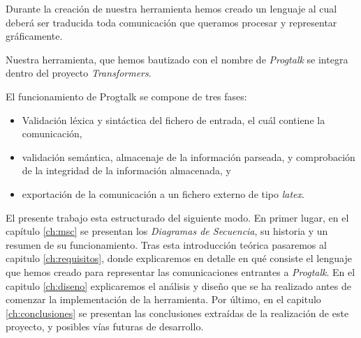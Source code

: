 Durante la creación de nuestra herramienta hemos creado un lenguaje 
al cual deberá ser traducida toda comunicación que queramos procesar y
representar gráficamente.

Nuestra herramienta, que hemos bautizado con el nombre de
\textit{Progtalk} se integra dentro del proyecto \textit{Transformers}. 

El funcionamiento de Progtalk se compone de tres fases:

\begin{itemize}
\item Validación léxica y sintáctica del fichero de entrada, el cuál
  contiene la comunicación,
\item validación semántica, almacenaje de la información parseada, y
  comprobación de la integridad de la información almacenada, y
\item exportación de la comunicación a un fichero externo de tipo
  \textit{latex}.
\end{itemize}

El presente trabajo esta estructurado del siguiente modo. En primer
lugar, en el capítulo \ref{ch:msc} se presentan los \textit{Diagramas
  de Secuencia}, su historia y un resumen de su funcionamiento. Tras
esta introducción teórica pasaremos al capitulo \ref{ch:requisitos},
donde explicaremos en detalle en qué consiste el lenguaje que hemos
creado para representar las comunicaciones entrantes a
\textit{Progtalk}. En el capitulo \ref{ch:diseno} explicaremos el
análisis y diseño que se ha realizado antes de comenzar la
implementación de la herramienta. Por último, en el capitulo
\ref{ch:conclusiones} se presentan las conclusiones extraídas de la
realización de este proyecto, y posibles vías futuras de desarrollo.

